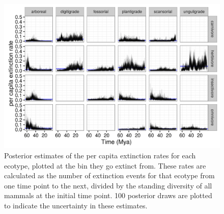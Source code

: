 \documentclass[12pt,letterpaper]{article}
\begin{document}
\begin{figure}[ht]
  \centering
  \includegraphics[width=\textwidth,height=0.4\textheight,keepaspectratio=true]{figure/death_eco}
  \caption[Estimated per capita extinction rates by mammal ecotype]{Posterior estimates of the per capita extinction rates for each ecotype, plotted at the bin they go extinct from. These rates are calculated as the number of extinction events for that ecotype from one time point to the next, divided by the standing diversity of all mammals at the initial time point. 100 posterior draws are plotted to indicate the uncertainty in these estimates.}
  \label{fig:ecotype_death}
\end{figure}
\end{document}
